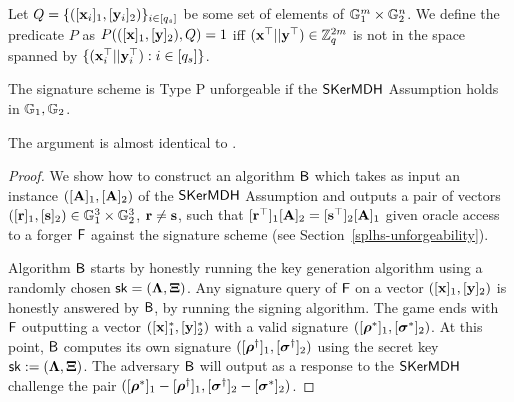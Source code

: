 Let $Q=\{ ([\mathbf{x}_i]_1,[\mathbf{y}_i]_2) \}_{i \in [q_s]}$ be some set of elements of $\mathbb{G}_1^{m} \times \mathbb{G}_2^n$. We define the predicate $P$ as $P(([\mathbf{x}]_1,[\mathbf{y}]_2),Q)=1$ iff $(\mathbf{x}^{\top}||\mathbf{y}^{\top}) \in \mathbb{Z}_q^{2m}$ is not in the space spanned by $\{(\mathbf{x}_i^{\top}||\mathbf{y}_i^{\top}) :i \in [q_s]\}$. 

\begin{theorem} The signature scheme is Type P unforgeable if the $\mathsf{SKerMDH}$ Assumption holds in $\mathbb{G}_1,\mathbb{G}_2$.
\end{theorem}
The argument is almost identical to  \cite{C:LPJY13}.
\begin{proof} We show how to construct an algorithm $\mathsf{B}$ which takes as input an instance $([\mathbf{{A}}]_1,[\mathbf{{A}}]_2)$ of the $\mathsf{SKerMDH}$ Assumption and outputs a pair of vectors $([\mathbf{r}]_1,[\mathbf{s}]_2) \in \mathbb{G}_1^{3} \times \mathbb{G}_2^{3}$, $\mathbf{r} \neq \mathbf{s}$, such that 
$[\mathbf{r}^{\top}]_1 [\mathbf{{A}}]_2=[\mathbf{s}^{\top}]_2 [\mathbf{{A}}]_1$ given oracle access to a forger $\mathsf{F}$ against the signature scheme
(see Section~\ref{splhs-unforgeability}). 

Algorithm $\mathsf{B}$ starts by honestly running the key generation algorithm 
using a randomly chosen $\mathsf{sk}=(\mathbf{{\Lambda}},\mathbf{{\Xi}})$. Any signature query of $\mathsf{F}$ on a vector
$([\mathbf{x}]_1,[\mathbf{y}]_2)$ is honestly answered by $\mathsf{B}$, by running the signing algorithm.
The game ends with $\mathsf{F}$ outputting a vector $([\mathbf{x}]_1^*,[\mathbf{y}]_2^*)$ 
with a valid signature $([{\boldsymbol \rho}^{*}]_1, [{\boldsymbol \sigma}^{*}]_2)$. At this point, $\mathsf{B}$ computes its own signature $([{\boldsymbol \rho}^{\dagger}]_1, [{\boldsymbol \sigma}^{\dagger}]_2)$ using the secret key $\mathsf{sk}:=(\mathbf{{\Lambda}},\mathbf{{\Xi}})$. The adversary $\mathsf{B}$ will output as a response to the $\mathsf{SKerMDH}$ challenge the pair $([{\boldsymbol \rho}^{*}]_1-[{\boldsymbol \rho}^{\dagger}]_1,[ {\boldsymbol \sigma}^{\dagger}]_2-[{\boldsymbol \sigma}^{*}]_2)$.


\end{proof}
